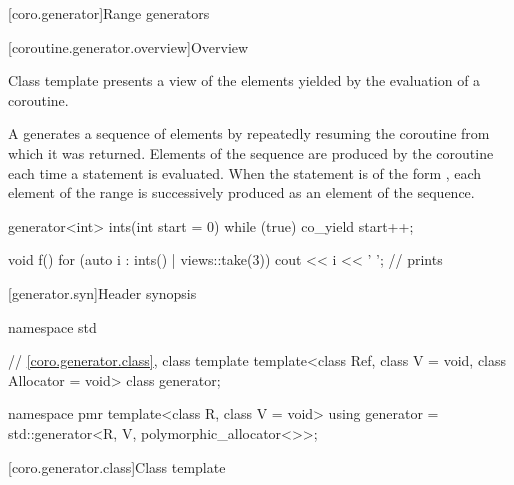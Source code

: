 [coro.generator]{Range generators}

[coroutine.generator.overview]{Overview}

\pnum
Class template  presents
a view of the elements yielded by the evaluation of a coroutine.

\pnum
A  generates a sequence of elements by
repeatedly resuming the coroutine from which it was returned.
Elements of the sequence are produced by the coroutine
each time a  statement is evaluated.
When the  statement is of the form
,
each element of the range 
is successively produced as an element of the sequence.
\begin{example}
\begin{codeblock}
generator<int> ints(int start = 0) {
  while (true)
    co_yield start++;
}

void f() {
  for (auto i : ints() | views::take(3))
    cout << i << ' ';       // prints 
}
\end{codeblock}
\end{example}

[generator.syn]{Header  synopsis}

%
\begin{codeblock}
namespace std {
  // \ref{coro.generator.class}, class template 
  template<class Ref, class V = void, class Allocator = void>
    class generator;

  namespace pmr {
    template<class R, class V = void>
      using generator = std::generator<R, V, polymorphic_allocator<>>;
  }
}
\end{codeblock}

[coro.generator.class]{Class template }

